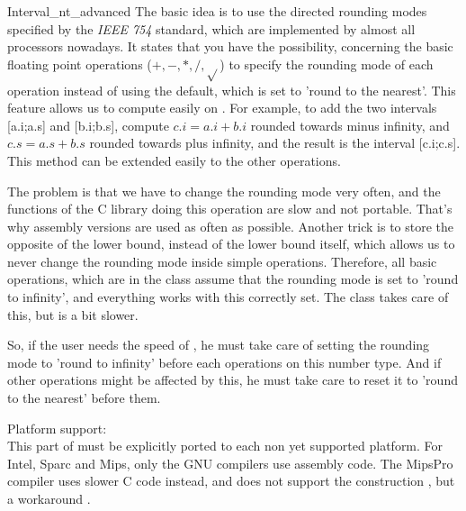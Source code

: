 \begin{ccAdvanced}
\begin{ccClass} {Interval_nt_advanced}
The basic idea is to use the directed rounding modes specified by the 
{\it IEEE 754} standard, which are implemented by almost all processors 
nowadays.
It states that you have the possibility, concerning the basic floating point
operations ($+,-,*,/,\sqrt{}$) to specify the rounding mode of each operation
instead of using the default, which is set to 'round to the nearest'.
This feature allows us to compute easily on .  For example, to
add the two intervals [a.i;a.s] and [b.i;b.s], compute $c.i=a.i+b.i$ rounded
towards minus infinity, and $c.s=a.s+b.s$ rounded towards plus infinity, and
the result is the interval [c.i;c.s].  This method can be extended easily to
the other operations.

The problem is that we have to change the rounding mode very often, and the
functions of the C library doing this operation are slow and not portable.
That's why assembly versions are used as often as possible.
Another trick is to store the opposite of the lower bound, instead of the
lower bound itself, which allows us to never change the rounding mode inside
simple operations.  Therefore, all basic operations, which are in the class 
 assume that the rounding mode is set to 
'round to infinity', and everything works with this correctly set.  
The class  takes care of this, but is a bit slower.

So, if the user needs the speed of , he must
take care of setting the rounding mode to 'round to infinity' before each
operations on this number type.  And if other operations might be affected by
this, he must take care to reset it to 'round to the nearest' before them.


Platform support:\\
This part of {\cgal} must be explicitly ported to each non yet supported
platform.  For Intel, Sparc and Mips, only the GNU compilers use assembly
code.  The MipsPro compiler uses slower C code instead, and does not
support the construction , but a workaround
.

\end{ccClass}

\end{ccAdvanced}


